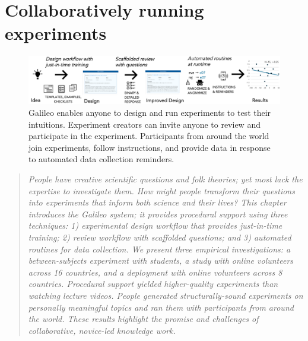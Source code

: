 \chapter{Collaboratively running experiments}

\begin{figure}[h] 
  \centering
  \includegraphics[width=1.0\textwidth]{figures/galileo/galileo-1}
  \caption[Galileo enables anyone to design and run experiments to test their intuitions]
{Galileo enables anyone to design and run experiments to test their intuitions. Experiment creators can invite anyone to review and participate in the experiment. Participants from around the world join experiments, follow instructions, and provide data in response to automated data collection reminders.}
  \label{fig:galileo-1}
\end{figure}

\begin{quote}
\emph{People have creative scientific questions and folk theories;
yet most lack the expertise to investigate them. How might
people transform their questions into experiments that
inform both science and their lives? This chapter introduces
the Galileo system; it provides procedural support using
three techniques: 1) experimental design workflow that
provides just-in-time training; 2) review workflow with
scaffolded questions; and 3) automated routines for data
collection. We present three empirical investigations: a
between-subjects experiment with students, a study with
online volunteers across 16 countries, and a deployment
with online volunteers across 8 countries. Procedural
support yielded higher-quality experiments than watching
lecture videos. People generated structurally-sound experiments
on personally meaningful topics and ran them with
participants from around the world. These results highlight
the promise and challenges of collaborative, novice-led
knowledge work.}
\end{quote}
\vspace{0.25in}

